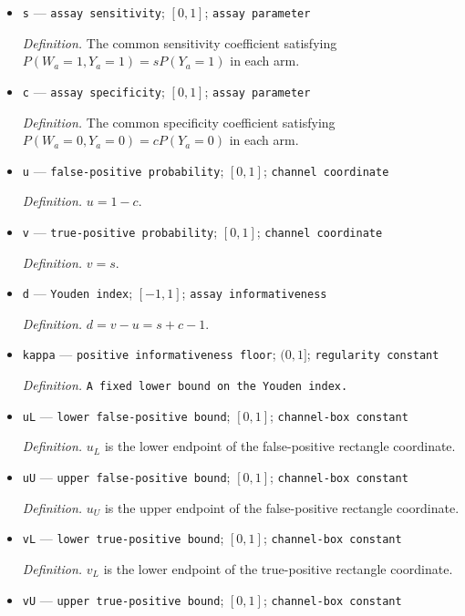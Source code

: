 \documentclass{article}
\begin{document}
\begin{itemize}
  \item \texttt{s} --- \texttt{assay sensitivity}; \([0,1]\); \texttt{assay parameter}
  \par\smallskip\noindent\emph{Definition.} The common sensitivity coefficient satisfying \(P(W_a=1,Y_a=1)=sP(Y_a=1)\) in each arm.
  \item \texttt{c} --- \texttt{assay specificity}; \([0,1]\); \texttt{assay parameter}
  \par\smallskip\noindent\emph{Definition.} The common specificity coefficient satisfying \(P(W_a=0,Y_a=0)=cP(Y_a=0)\) in each arm.
  \item \texttt{u} --- \texttt{false-\allowbreak{}positive probability}; \([0,1]\); \texttt{channel coordinate}
  \par\smallskip\noindent\emph{Definition.} \(u=1-c\).
  \item \texttt{v} --- \texttt{true-\allowbreak{}positive probability}; \([0,1]\); \texttt{channel coordinate}
  \par\smallskip\noindent\emph{Definition.} \(v=s\).
  \item \texttt{d} --- \texttt{Youden index}; \([-1,1]\); \texttt{assay informativeness}
  \par\smallskip\noindent\emph{Definition.} \(d=v-u=s+c-1\).
  \item \texttt{kappa} --- \texttt{positive informativeness floor}; \((0,1]\); \texttt{regularity constant}
  \par\smallskip\noindent\emph{Definition.} \texttt{A fixed lower bound on the Youden index.}
  \item \texttt{uL} --- \texttt{lower false-\allowbreak{}positive bound}; \([0,1]\); \texttt{channel-\allowbreak{}box constant}
  \par\smallskip\noindent\emph{Definition.} \(u_L\) is the lower endpoint of the false-positive rectangle coordinate.
  \item \texttt{uU} --- \texttt{upper false-\allowbreak{}positive bound}; \([0,1]\); \texttt{channel-\allowbreak{}box constant}
  \par\smallskip\noindent\emph{Definition.} \(u_U\) is the upper endpoint of the false-positive rectangle coordinate.
  \item \texttt{vL} --- \texttt{lower true-\allowbreak{}positive bound}; \([0,1]\); \texttt{channel-\allowbreak{}box constant}
  \par\smallskip\noindent\emph{Definition.} \(v_L\) is the lower endpoint of the true-positive rectangle coordinate.
  \item \texttt{vU} --- \texttt{upper true-\allowbreak{}positive bound}; \([0,1]\); \texttt{channel-\allowbreak{}box constant}

\end{itemize}
\end{document}
